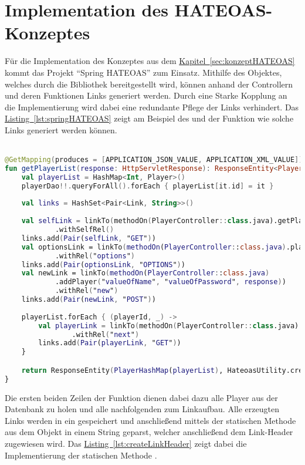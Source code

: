 \section{Implementation des HATEOAS-Konzeptes}
Für die Implementation des Konzeptes aus dem \hyperref[sec:konceptHATEOAS]{Kapitel~\ref{sec:konzeptHATEOAS}} kommt das Projekt \enquote{Spring HATEOAS} zum Einsatz. Mithilfe des  Objektes, welches durch die Bibliothek bereitgestellt wird, können anhand der Controllern und deren Funktionen Links generiert werden. Durch eine Starke Kopplung an die Implementierung wird dabei eine redundante Pflege der Links verhindert. Das \hyperref[lst:springHATEOAS]{Listing~\ref{lst:springHATEOAS}} zeigt am Beispiel des  und der Funktion  wie solche Links generiert werden können.\\
\\
\begin{lstlisting}[style=lstStyleFramed, language=Kotlin, caption={Linkaufbau mithilfe des Projektes \enquote{Spring HATEOAS}}, label=lst:springHATEOAS, float]
@GetMapping(produces = [APPLICATION_JSON_VALUE, APPLICATION_XML_VALUE])
fun getPlayerList(response: HttpServletResponse): ResponseEntity<PlayerHashMap> {
	val playerList = HashMap<Int, Player>()
	playerDao!!.queryForAll().forEach { playerList[it.id] = it }
	
	val links = HashSet<Pair<Link, String>>()
	
	val selfLink = linkTo(methodOn(PlayerController::class.java).getPlayerList(response))
			.withSelfRel()
	links.add(Pair(selfLink, "GET"))
	val optionsLink = linkTo(methodOn(PlayerController::class.java).playerOptions(response))
			.withRel("options")
	links.add(Pair(optionsLink, "OPTIONS"))
	val newLink = linkTo(methodOn(PlayerController::class.java)
			.addPlayer("valueOfName", "valueOfPassword", response))
			.withRel("new")
	links.add(Pair(newLink, "POST"))
	
	playerList.forEach { (playerId, _) ->
		val playerLink = linkTo(methodOn(PlayerController::class.java).getPlayerById(playerId, response))
				.withRel("next")
		links.add(Pair(playerLink, "GET"))
	}

	return ResponseEntity(PlayerHashMap(playerList), HateoasUtility.createLinkHeader(links), OK)
}
\end{lstlisting}
Die ersten beiden Zeilen der Funktion dienen dabei dazu alle Player aus der Datenbank zu holen und alle nachfolgenden zum Linkaufbau. Alle erzeugten Links werden in ein  gespeichert und anschließend mittels der statischen Methode  aus dem Objekt  in einem String geparst, welcher anschließend dem Link-Header zugewiesen wird. Das \hyperref[lst:createLinkHeader]{Listing~\ref{lst:createLinkHeader}} zeigt dabei die Implementierung der statischen Methode .
